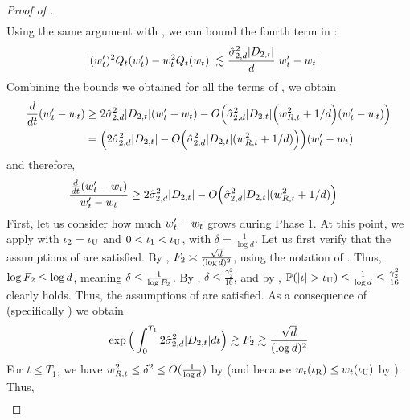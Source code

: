 \begin{proof}[Proof of ]
\begin{align}
\end{align}
Using the same argument with , we can bound the fourth term in :
\begin{align}
|(w_t')^2 Q_t(w_t') - w_t^2 Q_t(w_t)|
& \lesssim \frac{\hat{\sigma}_{2, d}^2 |D_{2, t}|}{d} |w_t' - w_t|
\end{align}
Combining the bounds we obtained for all the terms of , we obtain
\begin{align}
\frac{d}{dt} (w_t' - w_t)
& \geq 2\hat{\sigma}_{2, d}^2 |D_{2, t}| (w_t' - w_t) - O\Big(\hat{\sigma}_{2, d}^2 |D_{2, t}| \Big(w_{R, t}^2 + 1/d\Big) (w_t' - w_t)\Big) \\
& = \Big(2 \hat{\sigma}_{2, d}^2 |D_{2, t}| - O\Big(\hat{\sigma}_{2, d}^2 |D_{2, t}| (w_{R, t}^2 + 1/d)\Big) \Big) (w_t' - w_t)
\end{align}
and therefore,
\begin{align} \label{eq:diff_growth_rate_final}
\frac{\frac{d}{dt} (w_t' - w_t)}{w_t' - w_t}
& \geq 2 \hat{\sigma}_{2, d}^2 |D_{2, t}| - O\Big(\hat{\sigma}_{2, d}^2 |D_{2, t}| (w_{R, t}^2 + 1/d)\Big)
\end{align}
First, let us consider how much $w_t' - w_t$ grows during Phase 1. At this point, we apply  with $\iota_2 = \iota_{\textup{U}}$ and $0 < \iota_1 < \iota_{\textup{U}}$, with $\delta = \frac{1}{\log d}$. Let us first verify that the assumptions of  are satisfied. By , $F_2 \asymp \frac{\sqrt{d}}{(\log d)^2}$, using the notation of . Thus, $\log F_2 \leq \log d$, meaning $\delta \leq \frac{1}{\log F_2}$. By , $\delta \leq \frac{\gamma_2^2}{16}$, and by , $\mathbb{P}(|\iota| > \iota_{\textup{U}}) \leq \frac{1}{\log d} \leq \frac{\gamma_2^2}{16}$ clearly holds. Thus, the assumptions of  are satisfied. As a consequence of  (specifically ) we obtain
\begin{align} \label{eq:diff_signal_growth_integral_1}
\exp\Big(\int_{0}^{T_1} 2 \hat{\sigma}_{2, d}^2 |D_{2, t}| dt \Big)
 \gtrsim F_2
 \gtrsim \frac{\sqrt{d}}{(\log d)^2}
\end{align}
For $t \leq T_1$, we have $w_{R, t}^2 \leq \delta^2 \leq O(\frac{1}{\log d})$ by  (and because $w_t(\iota_{\textup{R}}) \leq w_t(\iota_{\textup{U}})$ by ). Thus,
\begin{align}

\end{align}
\end{proof}
